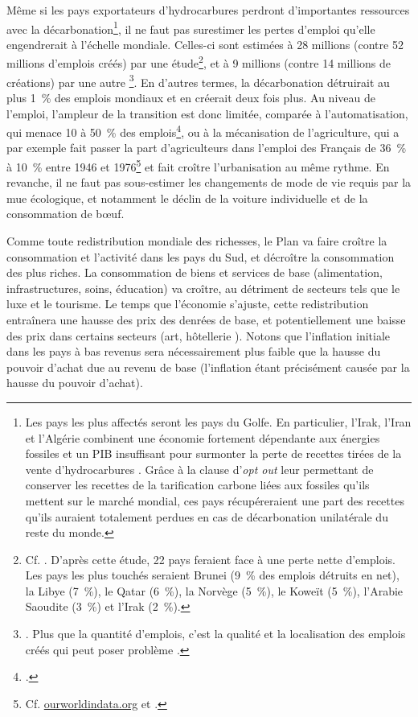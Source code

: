 \documentclass[a5paper,french,openany]{memoir}
\begin{document}
Même si les pays exportateurs d'hydrocarbures perdront d'importantes ressources avec la décarbonation\footnote{Les pays les plus affectés seront les pays du Golfe. En particulier, l'Irak, l'Iran et l'Algérie combinent une économie fortement dépendante aux énergies fossiles et un PIB insuffisant pour surmonter la perte de recettes tirées de la vente d'hydrocarbures \citep{muttitt_equity_2020}. 
Grâce à la clause d'\textit{opt out} leur permettant de conserver les recettes de la tarification carbone liées aux fossiles qu'ils mettent sur le marché mondial, %
ces pays récupéreraient une part des recettes qu'ils auraient totalement perdues en cas de décarbonation unilatérale du reste du monde.
}, il ne faut pas surestimer les pertes d'emploi qu'elle engendrerait à l'échelle mondiale. Celles-ci sont estimées à 28 millions (contre 52 millions d'emplois créés) par une étude\footnote{Cf. \cite{jacobson_100_2017}. D'après cette étude, 22 pays feraient face à une perte nette d'emplois. Les pays les plus touchés seraient Brunei (9~\% des emplois détruits en net), la Libye (7~\%), le Qatar (6~\%), la Norvège (5~\%), le Koweït (5~\%), l'Arabie Saoudite (3~\%) et l'Irak (2~\%).}, et à 9 millions (contre 14 millions de créations) par une autre
\footnote{\cite{pai_meeting_2021}. Plus que la quantité d'emplois, c'est la qualité et la localisation des emplois créés qui peut poser problème \citep{haywood_welfare_2021}.}. En d'autres termes, la décarbonation détruirait au plus 1~\% des emplois mondiaux et en créerait deux fois plus. Au niveau de l'emploi, l'ampleur de la transition est donc limitée, comparée à l'automatisation, qui menace 10 à 50~\% des emplois\footnote{\cite{frey_future_2017,lassebie_what_2022,hatzius_global_2023}.}, ou à la mécanisation de l'agriculture, qui a par exemple fait passer la part d'agriculteurs dans l'emploi des Français de 36~\% à 10~\% entre 1946 et 1976\footnote{Cf. \href{https://ourworldindata.org/grapher/urbanization-last-500-years?country=~FRA}{ourworldindata.org} et \href{https://ourworldindata.org/grapher/share-of-the-labor-force-employed-in-agriculture?tab=chart&time=1800..latest&country=FRA}{\cite{herrendorf_chapter_2014}}.} et fait croître l'urbanisation au même rythme. En revanche, il ne faut pas sous-estimer les changements de mode de vie requis par la mue écologique, et notamment le déclin de la voiture individuelle et de la consommation de bœuf.

Comme toute redistribution mondiale des richesses, le Plan va faire croître la consommation et l'activité dans les pays du Sud, et décroître la consommation des plus riches. La consommation de biens et services de base (alimentation, infrastructures, soins, éducation) va croître, au détriment de secteurs tels que le luxe et le tourisme. Le temps que l'économie s'ajuste, cette redistribution entraînera une hausse des prix des denrées de base, et potentiellement une baisse des prix dans certains secteurs (art, hôtellerie%
). 
Notons que l'inflation initiale dans les pays à bas revenus sera nécessairement plus faible que la hausse du pouvoir d'achat due au revenu de base (l'inflation étant précisément causée par la hausse du pouvoir d'achat). 
\end{document}
